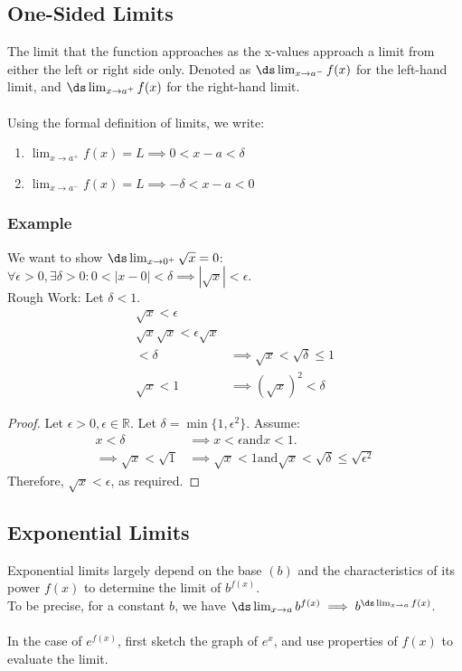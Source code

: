 \documentclass{article}
\begin{document}
\subsection{One-Sided Limits}
The limit that the function approaches as the x-values approach a limit from either the left or right side only. Denoted as $\ds \lim_{x \to a^-} f(x)$ for the left-hand limit, and $\ds \lim_{x \to a^+} f(x)$ for the right-hand limit.\\
\\
Using the formal definition of limits, we write:
\begin{enumerate}
    \item $\lim_{x \to a^+} f(x) = L \implies 0 < x - a < \delta$
    \item $\lim_{x \to a^-} f(x) = L \implies -\delta < x - a < 0$
\end{enumerate}
\subsubsection{Example}
We want to show $\ds \lim_{x \to 0^+}\sqrt{x} = 0$: $\forall \epsilon > 0, \exists \delta > 0 : 0 < | x - 0 | < \delta \implies | \sqrt{x}| < \epsilon $.\\
Rough Work: Let $\delta < 1$.
\begin{align*}
    \sqrt{x} < \epsilon\\
    \sqrt{x}\sqrt{x} < \epsilon \sqrt{x}\\
    < \delta & \implies \sqrt{x} < \sqrt{\delta} \leq 1\\
    \sqrt{x} < 1 & \implies (\sqrt{x})^2 < \delta
\end{align*}
\begin{proof}
Let $\epsilon > 0, \epsilon \in \mathbb{R}$. Let $\delta = \min\{1, \epsilon^2\}$.
Assume:
\begin{align*}
    x < \delta & \implies x < \epsilon \text{and} x < 1.\\
    \implies \sqrt{x} < \sqrt{1} & \implies \sqrt{x} < 1 \text{and} \sqrt{x} < \sqrt{\delta} \leq \sqrt{\epsilon^2}
\end{align*}
Therefore, $\sqrt{x} < \epsilon$, as required.
\end{proof}
\subsection{Exponential Limits}
Exponential limits largely depend on the base $(b)$ and the characteristics of its power $f(x)$ to determine the limit of $b^{f(x)}$.\\
To be precise, for a constant $b$, we have $\ds \lim_{x \to a} b^{f(x)} \implies b^{\ds \lim_{x \to a} f(x)}$.\\
\\
In the case of $e^{f(x)}$, first sketch the graph of $e^x$, and use properties of $f(x)$ to evaluate the limit. 
\end{document}
